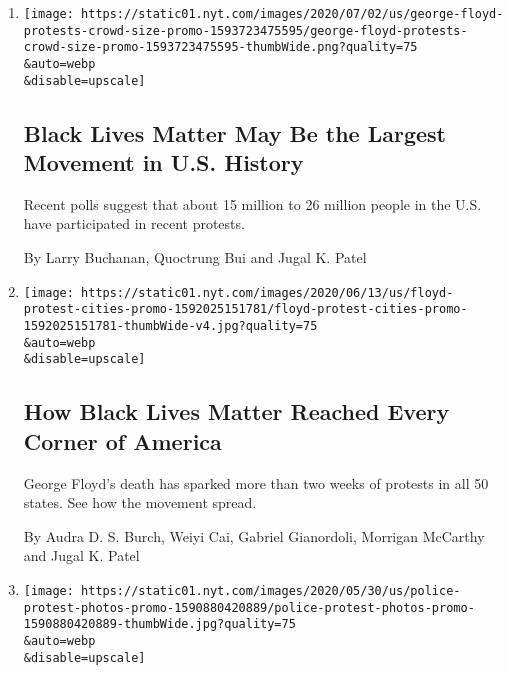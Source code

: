 \begin{enumerate}
\def\labelenumi{\arabic{enumi}.}
\item
  \href{/interactive/2020/07/03/us/george-floyd-protests-crowd-size.html}{}

  \texttt{[image: https://static01.nyt.com/images/2020/07/02/us/george-floyd-protests-crowd-size-promo-1593723475595/george-floyd-protests-crowd-size-promo-1593723475595-thumbWide.png?quality=75\\\&auto=webp\\\&disable=upscale]}

  \hypertarget{black-lives-matter-may-be-the-largest-movement-in-us-history}{%
  \subsection{Black Lives Matter May Be the Largest Movement in U.S.
  History}\label{black-lives-matter-may-be-the-largest-movement-in-us-history}}

  Recent polls suggest that about 15 million to 26 million people in the
  U.S. have participated in recent protests.

  By Larry Buchanan, Quoctrung Bui and Jugal K. Patel
\item
  \href{/interactive/2020/06/13/us/george-floyd-protests-cities-photos.html}{}

  \texttt{[image: https://static01.nyt.com/images/2020/06/13/us/floyd-protest-cities-promo-1592025151781/floyd-protest-cities-promo-1592025151781-thumbWide-v4.jpg?quality=75\\\&auto=webp\\\&disable=upscale]}

  \hypertarget{how-black-lives-matter-reached-every-corner-of-america}{%
  \subsection{How Black Lives Matter Reached Every Corner of
  America}\label{how-black-lives-matter-reached-every-corner-of-america}}

  George Floyd's death has sparked more than two weeks of protests in
  all 50 states. See how the movement spread.

  By Audra D. S. Burch, Weiyi Cai, Gabriel Gianordoli, Morrigan McCarthy
  and Jugal K. Patel
\item
  \href{/interactive/2020/05/30/us/george-floyd-protest-photos.html}{}

  \texttt{[image: https://static01.nyt.com/images/2020/05/30/us/police-protest-photos-promo-1590880420889/police-protest-photos-promo-1590880420889-thumbWide.jpg?quality=75\\\&auto=webp\\\&disable=upscale]}


\end{enumerate}
